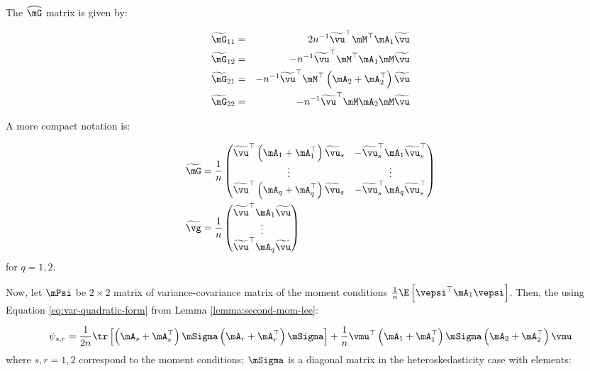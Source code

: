 \documentclass[english,12pt]{book}\usepackage[]{graphicx}\usepackage[]{xcolor}
\begin{document}
The $\widehat{\mG}$ matrix is given by:

\begin{eqnarray}
\widetilde{\mG}_{11} &=& 2n^{-1}\widetilde{\vu}^\top\mM^\top\mA_1\widetilde{\vu} \\
\widetilde{\mG}_{12} &=& -n^{-1}\widetilde{\vu}^\top\mM^\top\mA_1\mM\widetilde{\vu} \\
\widetilde{\mG}_{21} &=& -n^{-1}\widetilde{\vu}^\top\mM^\top\left(\mA_2 + \mA_2^\top\right)\widetilde{\vu} \\
\widetilde{\mG}_{22}&=& -n^{-1}\widetilde{\vu}^\top\mM\mA_2\mM\widetilde{\vu}
\end{eqnarray}

A more compact notation is:

\begin{equation*}
\begin{aligned}
\widetilde{\mG} & = \frac{1}{n}
                    \begin{pmatrix}
                      \widetilde{\vu}^\top\left(\mA_1 + \mA^\top_1\right)\widetilde{\vu}_s & - \widetilde{\vu}^\top_s\mA_1\widetilde{\vu}^\top_s \\
                      \vdots & \vdots \\
                      \widetilde{\vu}^\top\left(\mA_q + \mA^\top_q\right)\widetilde{\vu}_s & - \widetilde{\vu}^\top_s\mA_q\widetilde{\vu}^\top_s
                    \end{pmatrix} \\
\widetilde{\vg} & = \frac{1}{n}\begin{pmatrix}
                                \widetilde{\vu}^\top\mA_1\widetilde{\vu} \\
                                \vdots \\
                                \widetilde{\vu}^\top\mA_q\widetilde{\vu}
                                \end{pmatrix}
\end{aligned}
\end{equation*}
%
for $q = 1, 2$.

Now, let $\mPsi$ be $2\times 2$ matrix of variance-covariance matrix of the moment conditions $\frac{1}{n}\E\left[\vepsi^\top\mA_1\vepsi\right]$. Then, the using Equation \eqref{eq:var-quadratic-form} from  Lemma \ref{lemma:second-mom-lee}:

\begin{equation*}
\psi_{s,r}=\frac{1}{2n}\tr\left[\left(\mA_s + \mA_s^\top\right)\mSigma\left(\mA_r + \mA_r^\top\right)\mSigma\right]+\frac{1}{n}\vmu^\top\left(\mA_1 + \mA_1^\top\right)\mSigma\left(\mA_2 + \mA_2^\top\right)\vmu
\end{equation*}
%
where $s,r = 1,2$ correspond to the moment conditions; $\mSigma$ is a diagonal matrix in the heteroskedasticity case with elements:
\end{document}
